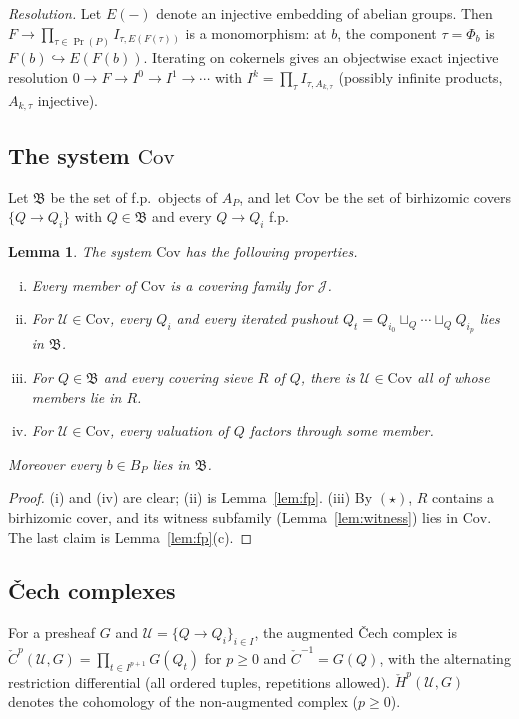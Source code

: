 \documentclass[11pt]{article}
\newtheorem{lemma}[theorem]{Lemma}
\theoremstyle{definition}
\theoremstyle{remark}
\newcommand{\Prin}{\operatorname{Pr}}
\newcommand{\Cov}{\mathrm{Cov}}
\newcommand{\fB}{\mathfrak{B}}
\newcommand{\cJ}{\mathcal{J}}
\newcommand{\cU}{\mathcal{U}}
\begin{document}
\emph{Resolution.} Let $E(-)$ denote an injective embedding of abelian groups. Then $F\to\prod_{\tau\in\Prin(P)}I_{\tau,E(F(\tau))}$ is a monomorphism: at $b$, the component $\tau=\Phi_b$ is $F(b)\hookrightarrow E(F(b))$. Iterating on cokernels gives an objectwise exact injective resolution $0\to F\to I^0\to I^1\to\cdots$ with $I^k=\prod_\tau I_{\tau,A_{k,\tau}}$ (possibly infinite products, $A_{k,\tau}$ injective).

\subsection{\texorpdfstring{The system $\Cov$}{The system Cov}}
Let $\fB$ be the set of f.p.\ objects of $A_P$, and let $\Cov$ be the set of birhizomic covers $\{Q\to Q_i\}$ with $Q\in\fB$ and every $Q\to Q_i$ f.p.

\begin{lemma}\label{lem:cov}
The system $\Cov$ has the following properties.
\begin{enumerate}[(i)]
\item Every member of $\Cov$ is a covering family for $\cJ$.
\item For $\cU\in\Cov$, every $Q_i$ and every iterated pushout $Q_t=Q_{i_0}\sqcup_Q\cdots\sqcup_QQ_{i_p}$ lies in $\fB$.
\item For $Q\in\fB$ and every covering sieve $R$ of $Q$, there is $\cU\in\Cov$ all of whose members lie in $R$.
\item For $\cU\in\Cov$, every valuation of $Q$ factors through some member.
\end{enumerate}
Moreover every $b\in B_P$ lies in $\fB$.
\end{lemma}
\begin{proof}
(i) and (iv) are clear; (ii) is Lemma~\ref{lem:fp}. (iii) By $(\star)$, $R$ contains a birhizomic cover, and its witness subfamily (Lemma~\ref{lem:witness}) lies in $\Cov$. The last claim is Lemma~\ref{lem:fp}(c).
\end{proof}

\subsection{Čech complexes}
For a presheaf $G$ and $\cU=\{Q\to Q_i\}_{i\in I}$, the augmented Čech complex is $\check C^p(\cU,G)=\prod_{t\in I^{p+1}}G(Q_t)$ for $p\ge0$ and $\check C^{-1}=G(Q)$, with the alternating restriction differential (all ordered tuples, repetitions allowed). $\check H^p(\cU,G)$ denotes the cohomology of the non-augmented complex ($p\ge0$).
\end{document}
